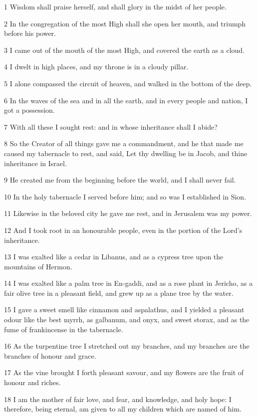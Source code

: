 \par 1 Wisdom shall praise herself, and shall glory in the midst of her people.
\par 2 In the congregation of the most High shall she open her mouth, and triumph before his power.
\par 3 I came out of the mouth of the most High, and covered the earth as a cloud.
\par 4 I dwelt in high places, and my throne is in a cloudy pillar.
\par 5 I alone compassed the circuit of heaven, and walked in the bottom of the deep.
\par 6 In the waves of the sea and in all the earth, and in every people and nation, I got a possession.
\par 7 With all these I sought rest: and in whose inheritance shall I abide?
\par 8 So the Creator of all things gave me a commandment, and he that made me caused my tabernacle to rest, and said, Let thy dwelling be in Jacob, and thine inheritance in Israel.
\par 9 He created me from the beginning before the world, and I shall never fail.
\par 10 In the holy tabernacle I served before him; and so was I established in Sion.
\par 11 Likewise in the beloved city he gave me rest, and in Jerusalem was my power.
\par 12 And I took root in an honourable people, even in the portion of the Lord's inheritance.
\par 13 I was exalted like a cedar in Libanus, and as a cypress tree upon the mountains of Hermon.
\par 14 I was exalted like a palm tree in En-gaddi, and as a rose plant in Jericho, as a fair olive tree in a pleasant field, and grew up as a plane tree by the water.
\par 15 I gave a sweet smell like cinnamon and aspalathus, and I yielded a pleasant odour like the best myrrh, as galbanum, and onyx, and sweet storax, and as the fume of frankincense in the tabernacle.
\par 16 As the turpentine tree I stretched out my branches, and my branches are the branches of honour and grace.
\par 17 As the vine brought I forth pleasant savour, and my flowers are the fruit of honour and riches.
\par 18 I am the mother of fair love, and fear, and knowledge, and holy hope: I therefore, being eternal, am given to all my children which are named of him.
